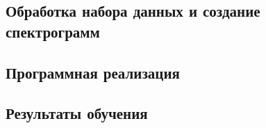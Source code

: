 \documentclass[spec, och, diploma]{SCWorks}
\begin{document}
    \subsection{Обработка набора данных и создание спектрограмм}

    \subsection{Программная реализация}

    \subsection{Результаты обучения}

\conclusion


\begin{thebibliography}{99}
    
    
    




\end{thebibliography}
\end{document}
